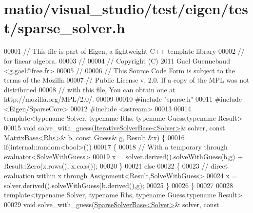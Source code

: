 \hypertarget{matio_2visual__studio_2test_2eigen_2test_2sparse__solver_8h_source}{}\section{matio/visual\+\_\+studio/test/eigen/test/sparse\+\_\+solver.h}
\label{matio_2visual__studio_2test_2eigen_2test_2sparse__solver_8h_source}

\begin{DoxyCode}
00001 \textcolor{comment}{// This file is part of Eigen, a lightweight C++ template library}
00002 \textcolor{comment}{// for linear algebra.}
00003 \textcolor{comment}{//}
00004 \textcolor{comment}{// Copyright (C) 2011 Gael Guennebaud <g.gael@free.fr>}
00005 \textcolor{comment}{//}
00006 \textcolor{comment}{// This Source Code Form is subject to the terms of the Mozilla}
00007 \textcolor{comment}{// Public License v. 2.0. If a copy of the MPL was not distributed}
00008 \textcolor{comment}{// with this file, You can obtain one at http://mozilla.org/MPL/2.0/.}
00009 
00010 \textcolor{preprocessor}{#include "sparse.h"}
00011 \textcolor{preprocessor}{#include <Eigen/SparseCore>}
00012 \textcolor{preprocessor}{#include <sstream>}
00013 
00014 \textcolor{keyword}{template}<\textcolor{keyword}{typename} Solver, \textcolor{keyword}{typename} Rhs, \textcolor{keyword}{typename} Guess,\textcolor{keyword}{typename} Result>
00015 \textcolor{keywordtype}{void} solve\_with\_guess(\hyperlink{group___iterative_linear_solvers___module_class_eigen_1_1_iterative_solver_base}{IterativeSolverBase<Solver>}& solver, \textcolor{keyword}{const} 
      \hyperlink{group___core___module_class_eigen_1_1_matrix_base}{MatrixBase<Rhs>}& b, \textcolor{keyword}{const} Guess& g, Result &x) \{
00016   \textcolor{keywordflow}{if}(internal::random<bool>())
00017   \{
00018     \textcolor{comment}{// With a temporary through evaluator<SolveWithGuess>}
00019     x = solver.derived().solveWithGuess(b,g) + Result::Zero(x.rows(), x.cols());
00020   \}
00021   \textcolor{keywordflow}{else}
00022   \{
00023     \textcolor{comment}{// direct evaluation within x through Assignment<Result,SolveWithGuess>}
00024     x = solver.derived().solveWithGuess(b.derived(),g);
00025   \}
00026 \}
00027 
00028 \textcolor{keyword}{template}<\textcolor{keyword}{typename} Solver, \textcolor{keyword}{typename} Rhs, \textcolor{keyword}{typename} Guess,\textcolor{keyword}{typename} Result>
00029 \textcolor{keywordtype}{void} solve\_with\_guess(\hyperlink{group___sparse_core___module_class_eigen_1_1_sparse_solver_base}{SparseSolverBase<Solver>}& solver, \textcolor{keyword}{const} 

\end{DoxyCode}
